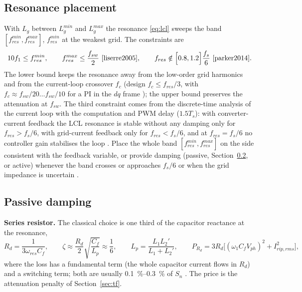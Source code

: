 \documentclass[10pt,a4paper]{scrartcl}
\newcommand{\fsw}{f_{sw}}
\newcommand{\fres}{f_{res}}
\newcommand{\wres}{\omega_{res}}
\newcommand{\Cf}{C_{f}}
\newcommand{\Lg}{L_{g}}
\begin{document}
\begin{onehalfspace}
\subsection{Resonance placement}
\label{sec:resgrid}
With $\Lg$ between $\Lg^{min}$ and $\Lg^{max}$ the resonance \eqref{eq:lcl} sweeps the band $[\fres^{min}, \fres^{max}]$, $\fres^{min}$ at the weakest grid. The constraints are
\begin{equation}
10 f_1 \le \fres^{min},\qquad \fres^{max} \le \frac{\fsw}{2}\ \text{\cite{liserre2005}},\qquad
\fres \notin \Big[0.8, 1.2\Big]\frac{f_s}{6}\ \text{\cite{parker2014}}.
\label{eq:resband}
\end{equation}
The lower bound keeps the resonance away from the low-order grid harmonics and from the current-loop crossover $f_c$ (design $f_c \le \fres/3$, with $f_c \approx \fsw/20 \ldots \fsw/10$ for a PI in the $dq$ frame \cite{dannehl2009}); the upper bound preserves the attenuation at $\fsw$. The third constraint comes from the discrete-time analysis of the current loop with the computation and PWM delay ($1.5 T_s$): with converter-current feedback the LCL resonance is stable without any damping only for $\fres > f_s/6$, with grid-current feedback only for $\fres < f_s/6$, and at $\fres = f_s/6$ no controller gain stabilises the loop \cite{parker2014}. Place the whole band $[\fres^{min}, \fres^{max}]$ on the side consistent with the feedback variable, or provide damping (passive, Section~\ref{sec:dampgrid}, or active) whenever the band crosses or approaches $f_s/6$ or when the grid impedance is uncertain \cite{liserre2006,pena2014}.

\subsection{Passive damping}
\label{sec:dampgrid}
\textbf{Series resistor.} The classical choice \cite{liserre2005} is one third of the capacitor reactance at the resonance,
\begin{equation}
R_d = \frac{1}{3\wres\Cf},\qquad \zeta \approx \frac{R_d}{2}\sqrt{\frac{\Cf}{L_p}} \approx \frac16,\qquad L_p = \frac{L_1 L_2'}{L_1 + L_2'},\qquad
P_{R_d} = 3 R_d \big[(\omega_1 \Cf V_{ph})^2 + I_{rip,rms}^2\big],
\label{eq:Rd}
\end{equation}
where the loss has a fundamental term (the whole capacitor current flows in $R_d$) and a switching term; both are usually \SIrange{0.1}{0.3}{\percent} of $S_n$ \cite{pena2013}. The price is the attenuation penalty of Section~\ref{sec:tf}.


\end{onehalfspace}
\end{document}
